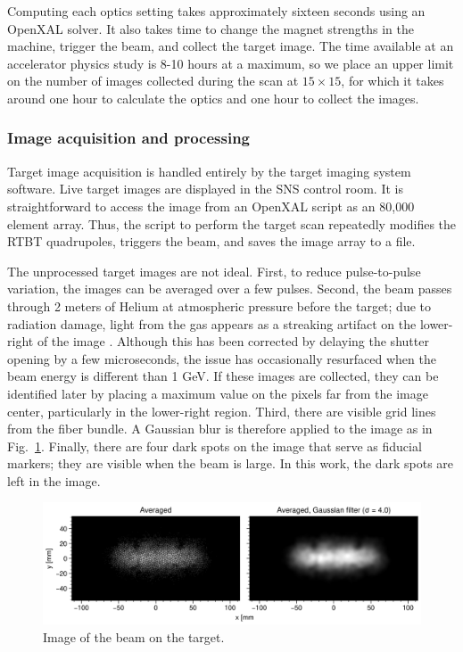 %
Computing each optics setting takes approximately sixteen seconds using an OpenXAL solver. It also takes time to change the magnet strengths in the machine, trigger the beam, and collect the target image. The time available at an accelerator physics study is 8-10 hours at a maximum, so we place an upper limit on the number of images collected during the scan at $15 \times 15$, for which it takes around one hour to calculate the optics and one hour to collect the images. 


\subsubsection{Image acquisition and processing}

Target image acquisition is handled entirely by the target imaging system software. Live target images are displayed in the SNS control room. It is straightforward to access the image from an OpenXAL script as an 80,000 element array. Thus, the script to perform the target scan repeatedly modifies the RTBT quadrupoles, triggers the beam, and saves the image array to a file.

The unprocessed target images are not ideal. First, to reduce pulse-to-pulse variation, the images can be averaged over a few pulses. Second, the beam passes through 2 meters of Helium at atmospheric pressure before the target; due to radiation damage, light from the gas appears as a streaking artifact on the lower-right of the image \cite{Blokland2010}. Although this has been corrected by delaying the shutter opening by a few microseconds, the issue has occasionally resurfaced when the beam energy is different than 1 GeV. If these images are collected, they can be identified later by placing a maximum value on the pixels far from the image center, particularly in the lower-right region. Third, there are visible grid lines from the fiber bundle. A Gaussian blur is therefore applied to the image as in Fig.~\ref{fig:target_image}. Finally, there are four dark spots on the image that serve as fiducial markers; they are visible when the beam is large. In this work, the dark spots are left in the image.
%
\begin{figure}[!p]
    \centering
    \includegraphics[width=1.0\textwidth]{Images/chapter4/target_image.png}
    \caption{Image of the beam on the target.}
    \label{fig:target_image}
\end{figure}
%


